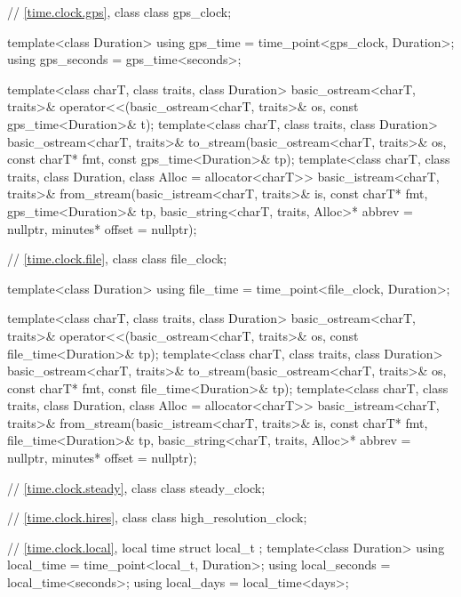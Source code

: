 \begin{codeblock}
{{    // \ref{time.clock.gps}, class 
    class gps_clock;

    template<class Duration>
      using gps_time  = time_point<gps_clock, Duration>;
    using gps_seconds = gps_time<seconds>;

    template<class charT, class traits, class Duration>
      basic_ostream<charT, traits>&
        operator<<(basic_ostream<charT, traits>& os, const gps_time<Duration>& t);
    template<class charT, class traits, class Duration>
      basic_ostream<charT, traits>&
        to_stream(basic_ostream<charT, traits>& os, const charT* fmt,
                  const gps_time<Duration>& tp);
    template<class charT, class traits, class Duration, class Alloc = allocator<charT>>
      basic_istream<charT, traits>&
        from_stream(basic_istream<charT, traits>& is, const charT* fmt,
                    gps_time<Duration>& tp,
                    basic_string<charT, traits, Alloc>* abbrev = nullptr,
                    minutes* offset = nullptr);

    // \ref{time.clock.file}, class 
    class file_clock;

    template<class Duration>
      using file_time = time_point<file_clock, Duration>;

    template<class charT, class traits, class Duration>
      basic_ostream<charT, traits>&
        operator<<(basic_ostream<charT, traits>& os, const file_time<Duration>& tp);
    template<class charT, class traits, class Duration>
      basic_ostream<charT, traits>&
        to_stream(basic_ostream<charT, traits>& os, const charT* fmt,
                  const file_time<Duration>& tp);
    template<class charT, class traits, class Duration, class Alloc = allocator<charT>>
      basic_istream<charT, traits>&
        from_stream(basic_istream<charT, traits>& is, const charT* fmt,
                    file_time<Duration>& tp,
                    basic_string<charT, traits, Alloc>* abbrev = nullptr,
                    minutes* offset = nullptr);

    // \ref{time.clock.steady}, class 
    class steady_clock;

    // \ref{time.clock.hires}, class 
    class high_resolution_clock;

    // \ref{time.clock.local}, local time
    struct local_t {};
    template<class Duration>
      using local_time  = time_point<local_t, Duration>;
    using local_seconds = local_time<seconds>;
    using local_days    = local_time<days>;

}}
\end{codeblock}
